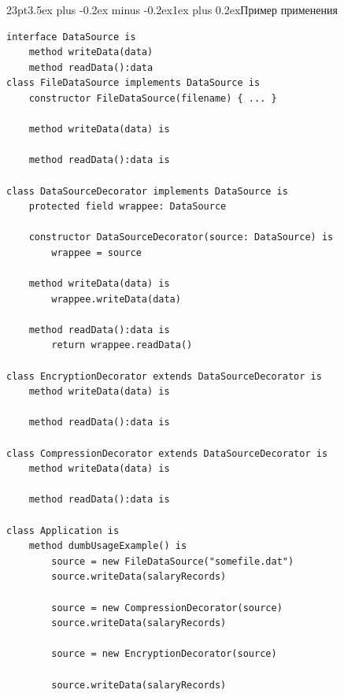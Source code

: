 \documentclass[12pt, a4paper]{book}%
\makeatletter
\renewcommand{\subsection}{\@startsection{subsection}{2}%
{23pt}{3.5ex plus -0.2ex minus -0.2ex}{1ex plus 0.2ex}{\bf}}%
\makeatother
\begin{document}
{\subsection{Пример применения}
\begin{lstlisting}
interface DataSource is
    method writeData(data)
    method readData():data
class FileDataSource implements DataSource is
    constructor FileDataSource(filename) { ... }

    method writeData(data) is

    method readData():data is

class DataSourceDecorator implements DataSource is
    protected field wrappee: DataSource

    constructor DataSourceDecorator(source: DataSource) is
        wrappee = source

    method writeData(data) is
        wrappee.writeData(data)

    method readData():data is
        return wrappee.readData()

class EncryptionDecorator extends DataSourceDecorator is
    method writeData(data) is

    method readData():data is

class CompressionDecorator extends DataSourceDecorator is
    method writeData(data) is

    method readData():data is

class Application is
    method dumbUsageExample() is
        source = new FileDataSource("somefile.dat")
        source.writeData(salaryRecords)

        source = new CompressionDecorator(source)
        source.writeData(salaryRecords)

        source = new EncryptionDecorator(source)

        source.writeData(salaryRecords)
\end{lstlisting}

}
\end{document}
